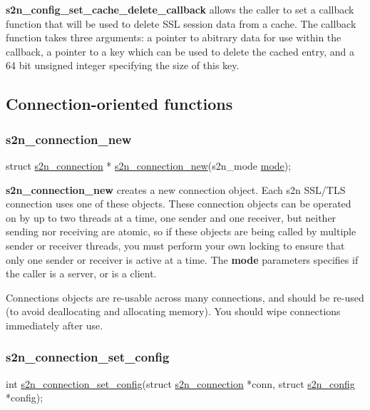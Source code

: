 {\bfseries s2n\+\_\+config\+\_\+set\+\_\+cache\+\_\+delete\+\_\+callback} allows the caller to set a callback function that will be used to delete S\+SL session data from a cache. The callback function takes three arguments\+: a pointer to abitrary data for use within the callback, a pointer to a key which can be used to delete the cached entry, and a 64 bit unsigned integer specifying the size of this key.

\subsection*{Connection-\/oriented functions}

\subsubsection*{s2n\+\_\+connection\+\_\+new}


\begin{DoxyCode}
\textcolor{keyword}{struct }\hyperlink{structs2n__connection}{s2n\_connection} * \hyperlink{s2n_8h_acffb3a7098380db63bc23498482ee4b9}{s2n\_connection\_new}(s2n\_mode 
      \hyperlink{structs2n__connection_a080df3a36b82d7a11f200fdf1a38f360}{mode});
\end{DoxyCode}


{\bfseries s2n\+\_\+connection\+\_\+new} creates a new connection object. Each s2n S\+S\+L/\+T\+LS connection uses one of these objects. These connection objects can be operated on by up to two threads at a time, one sender and one receiver, but neither sending nor receiving are atomic, so if these objects are being called by multiple sender or receiver threads, you must perform your own locking to ensure that only one sender or receiver is active at a time. The {\bfseries mode} parameters specifies if the caller is a server, or is a client.

Connections objects are re-\/usable across many connections, and should be re-\/used (to avoid deallocating and allocating memory). You should wipe connections immediately after use.

\subsubsection*{s2n\+\_\+connection\+\_\+set\+\_\+config}


\begin{DoxyCode}
\textcolor{keywordtype}{int} \hyperlink{s2n_8h_a85ced5d91831da552d5c4997a3f30abb}{s2n\_connection\_set\_config}(\textcolor{keyword}{struct} \hyperlink{structs2n__connection}{s2n\_connection} *conn, 
                              \textcolor{keyword}{struct} \hyperlink{structs2n__config}{s2n\_config} *config);
\end{DoxyCode}



